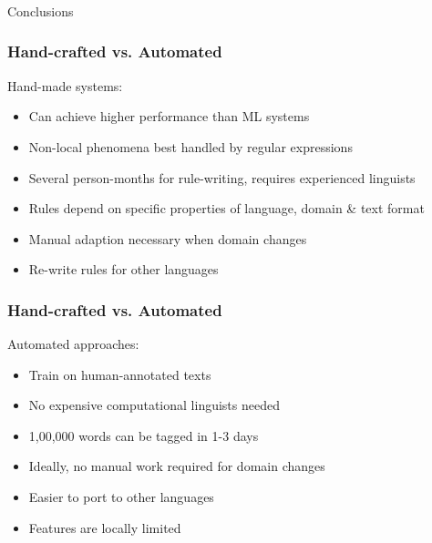 
\begin{frame}[fragile]\frametitle{}

\begin{center}
{\Large Conclusions}
\end{center}
\end{frame}


\begin{frame}[fragile]\frametitle{Hand-crafted vs. Automated }
Hand-made systems:
  \begin{itemize}
  \item Can achieve higher performance than ML systems
  \item Non-local phenomena best handled by regular expressions
  \item Several person-months for rule-writing, requires experienced linguists
  \item Rules depend on specific properties of language, domain \& text format  
  \item Manual adaption necessary when domain changes
  \item Re-write rules for other languages
  \end{itemize}
\end{frame}

\begin{frame}[fragile]\frametitle{Hand-crafted vs. Automated }
Automated approaches:
  \begin{itemize}
  \item Train on human-annotated texts
  \item No expensive computational linguists needed
  \item 1,00,000 words can be tagged in 1-3 days
  \item Ideally, no manual work required for domain changes
  \item Easier to port to other languages
  \item Features are locally limited
  \end{itemize}
\end{frame}

